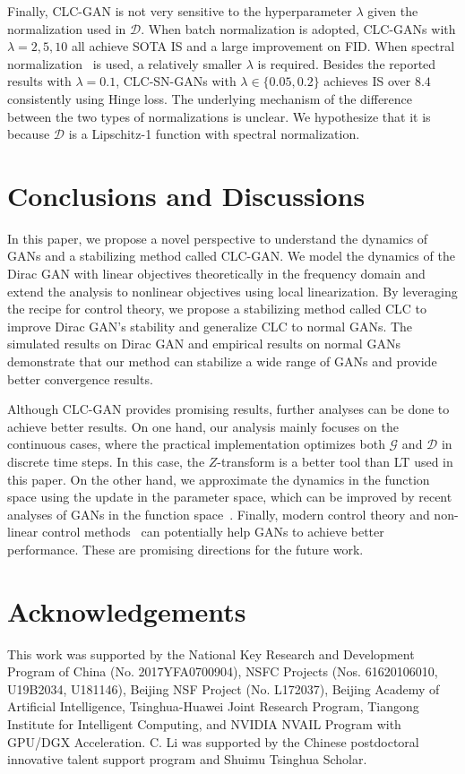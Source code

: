 \documentclass{article}
\newcommand{\xG}{\mathcal{G}}
\newcommand{\xD}{\mathcal{D}}
\theoremstyle{definition}
\begin{document}
Finally, CLC-GAN is not very sensitive to the hyperparameter $\lambda$ given the normalization used in $\xD$. When batch normalization is adopted, CLC-GANs with $\lambda=2, 5, 10$ all achieve SOTA IS and a large improvement on FID. When spectral normalization~\cite{miyato2018spectral} is used, a relatively smaller $\lambda$ is required. 
Besides the reported results with $\lambda=0.1$, CLC-SN-GANs with $\lambda\in\{0.05, 0.2\}$ achieves IS over $8.4$ consistently using Hinge loss.
The underlying mechanism of the difference between the two types of normalizations is unclear. We hypothesize that it is because $\xD$ is a Lipschitz-1 function with spectral normalization.
	


\section{Conclusions and Discussions}



In this paper, we propose a novel perspective to understand the dynamics of GANs and a stabilizing method called CLC-GAN. We model the dynamics of the Dirac GAN with linear objectives theoretically in the frequency domain and extend the analysis to nonlinear objectives using local linearization.
By leveraging the recipe for control theory, we propose a stabilizing method called CLC to improve Dirac GAN's stability and generalize CLC to normal GANs. The simulated results on Dirac GAN and empirical results on normal GANs demonstrate that our method can stabilize a wide range of GANs and provide better convergence results.

Although CLC-GAN provides promising results, further analyses can be done to achieve better results. On one hand, our analysis mainly focuses on the continuous cases, where the practical implementation optimizes both $\xG$ and $\xD$ in discrete time steps. In this case, the $Z$-transform is a better tool than LT used in this paper. On the other hand, we approximate the dynamics in the function space using the update in the parameter space, which can be improved by recent analyses of GANs in the function space~\citep{johnson2018composite}.
Finally, modern control theory and non-linear control methods~\citep{khalil2002nonlinear} can potentially help GANs to achieve better performance. These are promising directions for the future work.

\section*{Acknowledgements}
This work was supported by the National Key Research and Development Program of China (No. 2017YFA0700904), NSFC Projects (Nos. 61620106010, U19B2034, U181146), Beijing NSF Project (No. L172037), Beijing Academy of Artificial Intelligence, Tsinghua-Huawei Joint Research Program, Tiangong Institute for Intelligent Computing, and NVIDIA NVAIL Program with GPU/DGX Acceleration. C. Li was supported by the Chinese postdoctoral innovative talent support program and Shuimu Tsinghua Scholar.
\end{document}
